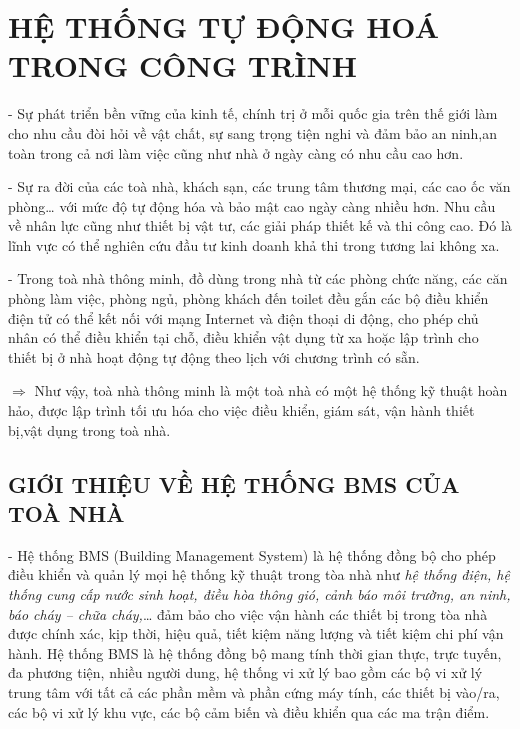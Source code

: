 	\section{HỆ THỐNG TỰ ĐỘNG HOÁ TRONG CÔNG TRÌNH}
	- Sự phát triển bền vững của kinh tế, chính trị ở mỗi quốc gia trên thế giới làm cho nhu cầu đòi hỏi về vật chất, sự sang trọng tiện nghi và đảm bảo an ninh,an toàn trong cả nơi làm việc cũng như nhà ở ngày càng có nhu cầu cao hơn.

	- Sự ra đời của các toà nhà, khách sạn, các trung tâm thương mại, các cao ốc văn phòng… với mức độ tự động hóa và bảo mật cao ngày càng nhiều hơn. Nhu cầu về nhân lực cũng như thiết bị vật tư, các giải pháp thiết kế và thi công cao. Đó là lĩnh vực có thể nghiên cứu đầu tư kinh doanh khả thi trong tương lai không xa.
	
	- Trong toà nhà thông minh, đồ dùng trong nhà từ các phòng chức năng, các căn phòng làm việc, phòng ngủ, phòng khách đến toilet đều gắn các bộ điều khiển điện tử có thể kết nối với mạng Internet và điện thoại di động, cho phép chủ nhân có thể điều khiển tại chỗ, điều khiển vật dụng từ xa hoặc lập trình cho thiết bị ở nhà hoạt động tự động theo lịch với chương trình có sẵn.
	
	{\large $\pmb{\Rightarrow}$} Như vậy, toà nhà thông minh là một toà nhà có một hệ thống kỹ thuật hoàn hảo, được lập trình tối ưu hóa cho việc điều khiển, giám sát, vận hành thiết bị,vật dụng trong toà nhà.	
	\subsection{GIỚI THIỆU VỀ HỆ THỐNG BMS CỦA TOÀ NHÀ}
	- Hệ thống BMS (Building Management System) là hệ thống đồng bộ cho phép điều khiển và quản lý mọi hệ thống kỹ thuật trong tòa nhà như \emph{hệ thống điện, hệ thống cung cấp nước sinh hoạt, điều hòa thông gió, cảnh báo môi trường, an ninh, báo cháy – chữa cháy,}… đảm bảo cho việc vận hành các thiết bị trong tòa nhà được chính xác, kịp thời, hiệu quả, tiết kiệm năng lượng và tiết kiệm chi phí vận hành. Hệ thống BMS là hệ thống đồng bộ mang tính thời gian thực, trực tuyến, đa phương tiện, nhiều người dung, hệ thống vi xử lý bao gồm các bộ vi xử lý trung tâm với tất cả các phần mềm và phần cứng máy tính, các thiết bị vào/ra, các bộ vi xử lý khu vực, các bộ cảm biến và điều khiển qua các ma trận điểm.
	
